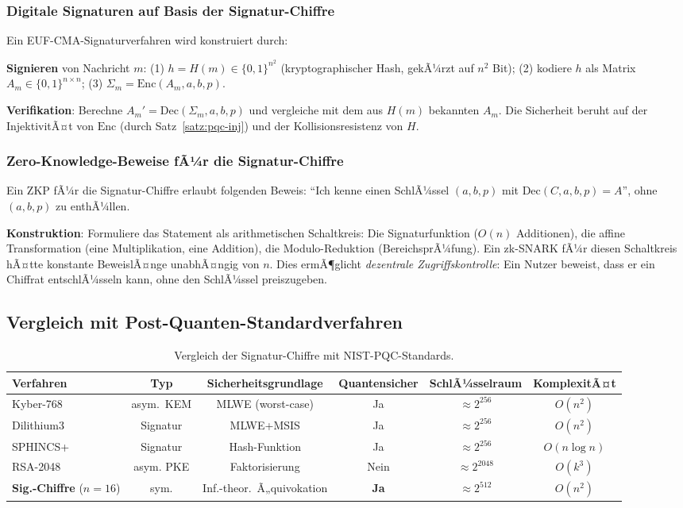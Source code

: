﻿\documentclass[a4paper,12pt]{article}
\theoremstyle{definition}
\begin{document}
\subsubsection{Digitale Signaturen auf Basis der Signatur-Chiffre}

Ein EUF-CMA-Signaturverfahren \cite{Epp26b} wird konstruiert durch:

\textbf{Signieren} von Nachricht $m$: (1) $h = H(m) \in \{0,1\}^{n^2}$
(kryptographischer Hash, gekÃ¼rzt auf $n^2$ Bit); (2) kodiere $h$ als Matrix
$A_m \in \{0,1\}^{n \times n}$; (3) $\Sigma_m = \mathrm{Enc}(A_m, a, b, p)$.

\textbf{Verifikation}: Berechne $A_m' = \mathrm{Dec}(\Sigma_m, a, b, p)$
und vergleiche mit dem aus $H(m)$ bekannten $A_m$.
Die Sicherheit beruht auf der InjektivitÃ¤t von $\mathrm{Enc}$
(durch Satz~\ref{satz:pqc-inj}) und der Kollisionsresistenz von $H$.

\subsubsection{Zero-Knowledge-Beweise fÃ¼r die Signatur-Chiffre}

Ein ZKP fÃ¼r die Signatur-Chiffre erlaubt folgenden Beweis: ``Ich kenne einen
SchlÃ¼ssel $(a,b,p)$ mit $\mathrm{Dec}(C, a,b,p) = A$'', ohne $(a,b,p)$ zu enthÃ¼llen.

\textbf{Konstruktion}: Formuliere das Statement als arithmetischen Schaltkreis:
Die Signaturfunktion ($O(n)$ Additionen), die affine Transformation
(eine Multiplikation, eine Addition), die Modulo-Reduktion (BereichsprÃ¼fung).
Ein zk-SNARK \cite{GGPR13} fÃ¼r diesen Schaltkreis hÃ¤tte konstante BeweislÃ¤nge
unabhÃ¤ngig von $n$. Dies ermÃ¶glicht \emph{dezentrale Zugriffskontrolle}: Ein
Nutzer beweist, dass er ein Chiffrat entschlÃ¼sseln kann, ohne den SchlÃ¼ssel
preiszugeben.

\subsection{Vergleich mit Post-Quanten-Standardverfahren}

\begin{table}
\centering
\caption{Vergleich der Signatur-Chiffre mit NIST-PQC-Standards.}
\label{tab:sigchiffre-comp}
\begin{tabular}{lccccc}
\toprule
Verfahren & Typ & Sicherheitsgrundlage & Quantensicher & SchlÃ¼sselraum & KomplexitÃ¤t \\
\midrule
Kyber-768     & asym.~KEM & MLWE (worst-case) & Ja & $\approx 2^{256}$ & $O(n^2)$ \\
Dilithium3    & Signatur  & MLWE+MSIS & Ja & $\approx 2^{256}$ & $O(n^2)$ \\
SPHINCS+      & Signatur  & Hash-Funktion & Ja & $\approx 2^{256}$ & $O(n \log n)$ \\
RSA-2048      & asym. PKE & Faktorisierung & Nein & $\approx 2^{2048}$ & $O(k^3)$ \\
\textbf{Sig.-Chiffre} ($n{=}16$) & sym. & Inf.-theor.~Ã„quivokation & \textbf{Ja} & $\approx 2^{512}$ & $O(n^2)$ \\
\bottomrule
\end{tabular}
\end{table}
\end{document}
